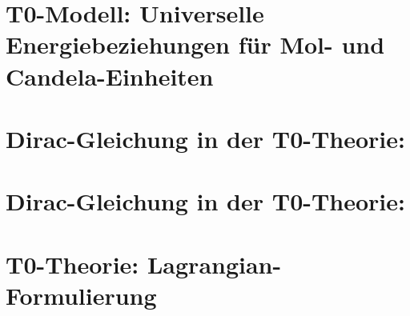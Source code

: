 	\chapter{T0-Modell: Universelle Energiebeziehungen für Mol- und Candela-Einheiten}
	
	\chapter{Dirac-Gleichung in der T0-Theorie:}
	
	\chapter{Dirac-Gleichung in der T0-Theorie:}
	
	\chapter{T0-Theorie: Lagrangian-Formulierung}
	

